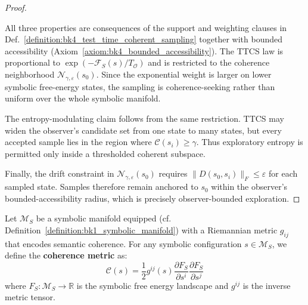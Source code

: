 \begin{proof}
\label{proof:bk4_properties_of_ttcs}
\leavevmode

All three properties are consequences of the support and weighting clauses in
Def.~\ref{definition:bk4_test_time_coherent_sampling} together with bounded
accessibility (Axiom~\ref{axiom:bk4_bounded_accessibility}). The TTCS law is
proportional to $\exp(-\mathcal F_S(s)/T_{\mathcal O})$ and is restricted to the
coherence neighborhood
$\mathcal N_{\gamma,\varepsilon}(s_0)$. Since the exponential weight is larger
on lower symbolic free-energy states, the sampling is coherence-seeking rather
than uniform over the whole symbolic manifold.

The entropy-modulating claim follows from the same restriction. TTCS may widen
the observer's candidate set from one state to many states, but every accepted
sample lies in the region where $\mathcal C(s_i)\geq\gamma$. Thus exploratory
entropy is permitted only inside a thresholded coherent subspace.

Finally, the drift constraint in
$\mathcal N_{\gamma,\varepsilon}(s_0)$ requires
$\|D(s_0,s_i)\|_F\leq\varepsilon$ for each sampled state. Samples therefore
remain anchored to $s_0$ within the observer's bounded-accessibility radius,
which is precisely observer-bounded exploration.
\end{proof}

\begin{definition}
\label{definition:bk4_coherence_metric_on_symbolic_manifold}
Let $\mathcal{M}_S$ be a symbolic manifold equipped (cf. Definition~\ref{definition:bk1_symbolic_manifold}) with a Riemannian metric $g_{ij}$ that encodes semantic coherence. For any symbolic configuration $s \in \mathcal{M}_S$, we define the \textbf{coherence metric} as:
\[
\mathcal{C}(s) = \frac{1}{2} g^{ij}(s) \frac{\partial F_S}{\partial s^i} \frac{\partial F_S}{\partial s^j}
\]
where $F_S: \mathcal{M}_S \to \mathbb{R}$ is the symbolic free energy landscape and $g^{ij}$ is the inverse metric tensor.
\end{definition}

